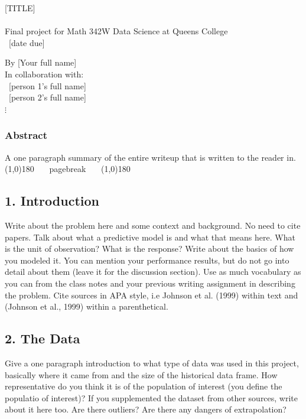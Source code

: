 \documentclass[12pt]{article}
\begin{document}
\begin{tcolorbox}

\begin{center}
\LARGE{[TITLE]}\\~\\
\footnotesize Final project for Math 342W Data Science at Queens College\\
~[date due]~
\end{center}

\begin{flushright}
By [Your full name]\\
In collaboration with:\\
~[person 1's full name]~\\
~[person 2's full name]~\\
$\vdots$~~~\\
\end{flushright}

\subsubsection*{Abstract}

A one paragraph summary of the entire writeup that is written to  the reader in.\\

\line(1,0){180} ~~~pagebreak~~~ \line(1,0){180}
\pagebreak

\subsection*{1. Introduction}

Write about the problem here and some context and background. No need to cite papers. Talk about what a predictive model is and what that means here. What is the unit of observation? What is the response? Write about the basics of how you modeled it. You can mention your performance results, but do not go into detail about them (leave it for the discussion section). Use as much vocabulary as you can from the class notes and your previous writing assignment in describing the problem. Cite sources in APA style, i.e Johnson et al. (1999) within text and (Johnson et al., 1999) within a parenthetical.


\subsection*{2. The Data}

Give a one paragraph introduction to what type of data was used in this project, basically where it came from and the size of the historical data frame. How representative do you think it is of the population of interest (you define the populatio of interest)? If you supplemented the dataset from other sources, write about it here too. Are there outliers? Are there any dangers of extrapolation?



\end{tcolorbox}
\end{document}
